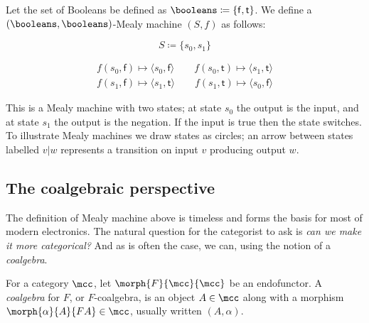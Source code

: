 \begin{example}\label{ex:mealy}
    Let the set of Booleans be defined as
    \(\booleans \coloneqq \{\mathsf{f},\mathsf{t}\}\).
    We define a \((\booleans,\booleans)\)-Mealy machine \((S, f)\) as follows:
    \begin{center}
        \begin{minipage}{0.33\textwidth}
            \[S \coloneqq \{s_0, s_1\}\]
        \end{minipage}
        \begin{minipage}{0.66\textwidth}
            \begin{gather*}
                f(s_0, \mathsf{f}) \mapsto \langle{s_0, \mathsf{f}}\rangle
                \qquad
                f(s_0, \mathsf{t}) \mapsto \langle{s_1, \mathsf{t}}\rangle
                \\
                f(s_1, \mathsf{f}) \mapsto \langle{s_1, \mathsf{t}}\rangle
                \qquad
                f(s_1, \mathsf{t}) \mapsto \langle{s_0, \mathsf{f}}\rangle
            \end{gather*}
        \end{minipage}
    \end{center}
    This is a Mealy machine with two states; at state \(s_0\) the output is the
    input, and at state \(s_1\) the output is the negation.
    If the input is true then the state switches.
    To illustrate Mealy machines we draw states as circles; an arrow between
    states labelled \(v|w\) represents a transition on input \(v\) producing
    output \(w\).
    \begin{center}
        
    \end{center}
\end{example}

\subsection{The coalgebraic perspective}

The definition of Mealy machine above is timeless and forms the basis for most
of modern electronics.
The natural question for the categorist to ask is
\emph{can we make it more categorical?}
And as is often the case, we can, using the notion of a \emph{coalgebra}.

\begin{definition}[Coalgebra]
    For a category \(\mcc\), let \(\morph{F}{\mcc}{\mcc}\) be an endofunctor.
    A \emph{coalgebra} for \(F\), or \(F\)-coalgebra, is an object
    \(A \in \mcc\) along with a morphism \(\morph{\alpha}{A}{FA} \in \mcc\),
    usually written \((A,\alpha)\).
\end{definition}

